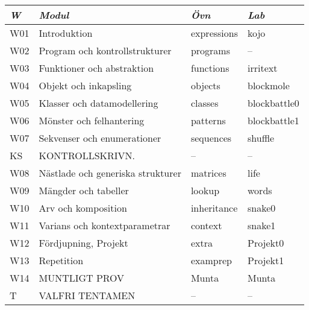 \begin{tabular}{l|l|l|l}
\textit{W} & \textit{Modul} & \textit{Övn} & \textit{Lab} \\ \hline \hline
W01 & Introduktion & expressions & kojo \\
W02 & Program och kontrollstrukturer & programs & -- \\
W03 & Funktioner och abstraktion & functions & irritext \\
W04 & Objekt och inkapsling & objects & blockmole \\
W05 & Klasser och datamodellering & classes & blockbattle0 \\
W06 & Mönster och felhantering & patterns & blockbattle1 \\
W07 & Sekvenser och enumerationer & sequences & shuffle \\
KS & KONTROLLSKRIVN. & -- & -- \\
W08 & Nästlade och generiska strukturer & matrices & life \\
W09 & Mängder och tabeller & lookup & words \\
W10 & Arv och komposition & inheritance & snake0 \\
W11 & Varians och kontextparametrar & context & snake1 \\
W12 & Fördjupning, Projekt & extra & Projekt0 \\
W13 & Repetition & examprep & Projekt1 \\
W14 & MUNTLIGT PROV & Munta & Munta \\
T & VALFRI TENTAMEN & -- & -- \\
\end{tabular}
